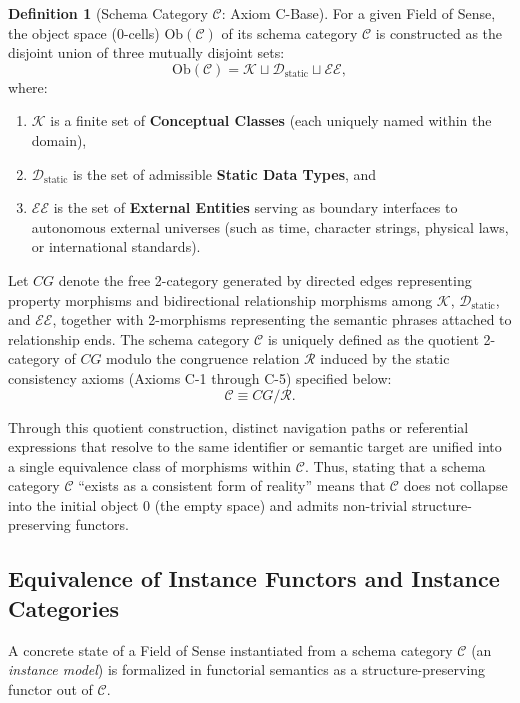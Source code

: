 \documentclass[11pt,a4paper]{article}
\theoremstyle{definition}
\newtheorem{definition}{Definition}[section]
\theoremstyle{plain}
\theoremstyle{remark}
\newcommand{\Ob}{\mathrm{Ob}}
\newcommand{\Dstatic}{\mathcal{D}_{\mathrm{static}}}
\begin{document}
\begin{definition}[Schema Category $\mathcal{C}$: Axiom C-Base]\label{def:schema-cat}
For a given Field of Sense, the object space (0-cells) $\Ob(\mathcal{C})$ of its schema category $\mathcal{C}$ is constructed as the disjoint union of three mutually disjoint sets:
\begin{equation}
\Ob(\mathcal{C}) = \mathcal{K} \sqcup \Dstatic \sqcup \mathcal{EE},
\end{equation}
where:
\begin{enumerate}
    \item $\mathcal{K}$ is a finite set of \textbf{Conceptual Classes} (each uniquely named within the domain),
    \item $\Dstatic$ is the set of admissible \textbf{Static Data Types}, and
    \item $\mathcal{EE}$ is the set of \textbf{External Entities} serving as boundary interfaces to autonomous external universes (such as time, character strings, physical laws, or international standards).
\end{enumerate}
Let $CG$ denote the free 2-category generated by directed edges representing property morphisms and bidirectional relationship morphisms among $\mathcal{K}$, $\Dstatic$, and $\mathcal{EE}$, together with 2-morphisms representing the semantic phrases attached to relationship ends. The schema category $\mathcal{C}$ is uniquely defined as the quotient 2-category of $CG$ modulo the congruence relation $\mathcal{R}$ induced by the static consistency axioms (Axioms C-1 through C-5) specified below:
\begin{equation}
\mathcal{C} \equiv CG / \mathcal{R}.
\end{equation}
\end{definition}

Through this quotient construction, distinct navigation paths or referential expressions that resolve to the same identifier or semantic target are unified into a single equivalence class of morphisms within $\mathcal{C}$. Thus, stating that a schema category $\mathcal{C}$ ``exists as a consistent form of reality'' means that $\mathcal{C}$ does not collapse into the initial object $0$ (the empty space) and admits non-trivial structure-preserving functors.

\subsection{Equivalence of Instance Functors and Instance Categories}
A concrete state of a Field of Sense instantiated from a schema category $\mathcal{C}$ (an \emph{instance model}) is formalized in functorial semantics as a structure-preserving functor out of $\mathcal{C}$.
\end{document}
